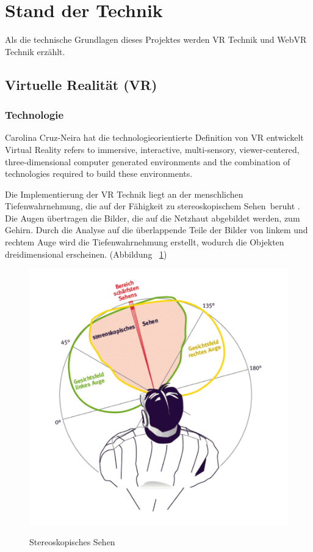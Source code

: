 \section{Stand der Technik}
Als die technische Grundlagen dieses Projektes werden VR Technik und WebVR Technik erzählt.
 \subsection{Virtuelle Realität (VR)}
  \subsubsection{Technologie}
Carolina Cruz-Neira \citep{19} hat die technologieorientierte Definition von VR entwickelt \glqq Virtual Reality refers to immersive, interactive, multi-sensory, viewer-centered, three-dimensional computer generated environments and the combination of technologies required to build these environments.\grqq\
  
Die Implementierung der VR Technik liegt an der menschlichen Tiefenwahrnehmung, die auf der Fähigkeit zu \glqq stereoskopischem Sehen\grqq\ beruht \citep{20}. Die Augen übertragen die Bilder, die auf die Netzhaut abgebildet werden, zum Gehirn. Durch die Analyse auf die überlappende Teile der Bilder von linkem und rechtem Auge wird die Tiefenwahrnehmung erstellt, wodurch die Objekten dreidimensional erscheinen. (Abbildung ~\ref{fig:stereoskopischesSehen})

\begin{figure}[ht]
\vspace*{1em}
\centering
\caption{Stereoskopisches Sehen}
\includegraphics[width=\textwidth]{images/stereoskopischesSehen.png}
\label{fig:stereoskopischesSehen} 
\end{figure}

